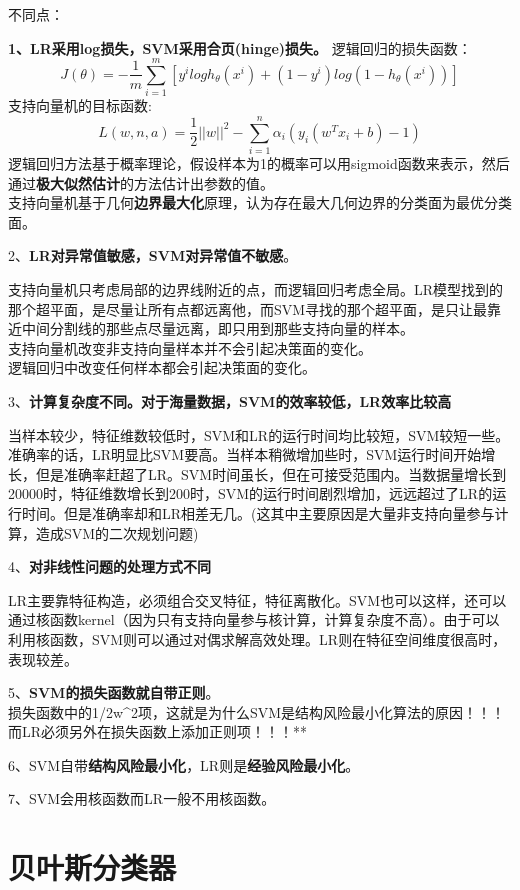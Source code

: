 不同点：

\textbf{1、LR采用log损失，SVM采用合页(hinge)损失。} 逻辑回归的损失函数：
\[
J(\theta)=-\frac{1}{m}\sum^m_{i=1}\left[y^{i}logh_{\theta}(x^{i})+ (1-y^{i})log(1-h_{\theta}(x^{i}))\right]
\] 支持向量机的目标函数: \[
L(w,n,a)=\frac{1}{2}||w||^2-\sum^n_{i=1}\alpha_i \left( y_i(w^Tx_i+b)-1\right)
\] ​
逻辑回归方法基于概率理论，假设样本为1的概率可以用sigmoid函数来表示，然后通过\textbf{极大似然估计}的方法估计出参数的值。\\
​
支持向量机基于几何\textbf{边界最大化}原理，认为存在最大几何边界的分类面为最优分类面。

2、\textbf{LR对异常值敏感，SVM对异常值不敏感}。

​
支持向量机只考虑局部的边界线附近的点，而逻辑回归考虑全局。LR模型找到的那个超平面，是尽量让所有点都远离他，而SVM寻找的那个超平面，是只让最靠近中间分割线的那些点尽量远离，即只用到那些支持向量的样本。\\
​ 支持向量机改变非支持向量样本并不会引起决策面的变化。\\
​ 逻辑回归中改变任何样本都会引起决策面的变化。

3、\textbf{计算复杂度不同。对于海量数据，SVM的效率较低，LR效率比较高}

​
当样本较少，特征维数较低时，SVM和LR的运行时间均比较短，SVM较短一些。准确率的话，LR明显比SVM要高。当样本稍微增加些时，SVM运行时间开始增长，但是准确率赶超了LR。SVM时间虽长，但在可接受范围内。当数据量增长到20000时，特征维数增长到200时，SVM的运行时间剧烈增加，远远超过了LR的运行时间。但是准确率却和LR相差无几。(这其中主要原因是大量非支持向量参与计算，造成SVM的二次规划问题)

4、\textbf{对非线性问题的处理方式不同}

​
LR主要靠特征构造，必须组合交叉特征，特征离散化。SVM也可以这样，还可以通过核函数kernel（因为只有支持向量参与核计算，计算复杂度不高）。由于可以利用核函数，SVM则可以通过对偶求解高效处理。LR则在特征空间维度很高时，表现较差。

5、\textbf{SVM的损失函数就自带正则}。\\
​
损失函数中的1/2\textbar{}\textbar{}w\textbar{}\textbar{}^2项，这就是为什么SVM是结构风险最小化算法的原因！！！而LR必须另外在损失函数上添加正则项！！！**

6、SVM自带\textbf{结构风险最小化}，LR则是\textbf{经验风险最小化}。

7、SVM会用核函数而LR一般不用核函数。

\section{贝叶斯分类器}\label{ux8d1dux53f6ux65afux5206ux7c7bux5668}

